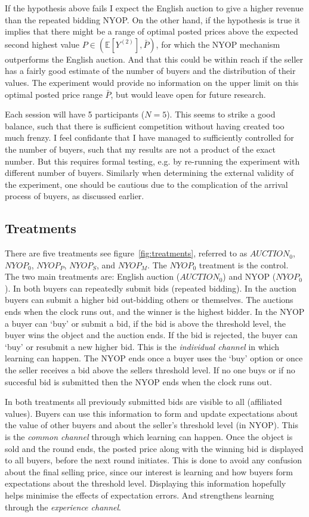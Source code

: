 \documentclass[a4paper,12pt]{article}
\begin{document}
	If the hypothesis above fails I expect the English auction to give a higher revenue than the repeated bidding NYOP. On the other hand, if the hypothesis is true it implies that there might be a range of optimal posted prices above the expected second highest value $P \in (\mathbb{E}[Y^{(2)}], \bar{P})$, for which the NYOP mechanism outperforms the English auction. And that this could be within reach if the seller has a fairly good estimate of the number of buyers and the distribution of their values. The experiment would provide no information on the upper limit on this optimal posted price range $\bar{P}$, but would leave open for future research.
	
	Each session will have 5 participants ($N=5$). This seems to strike a good balance, such that there is sufficient competition without having created too much frenzy. I feel confidante that I have managed to sufficiently controlled for the number of buyers, such that my results are not a product of the exact number. But this requires formal testing, e.g. by re-running the experiment with different number of buyers. Similarly when determining the external validity of the experiment, one should be cautious due to the complication of the arrival process of buyers, as discussed earlier.

	\subsection{Treatments}
	\label{sec:treatments}

	There are five treatments see figure~\ref{fig:treatments}, referred to as $AUCTION_0$, $NYOP_0$, $NYOP_P$, $NYOP_S$, and $NYOP_M$. The $NYOP_0$ treatment is the control. The two main treatments are: English auction ($AUCTION_0$) and NYOP ($NYOP_0$).
	In both buyers can repeatedly submit bids (repeated bidding). In the auction buyers can submit a higher bid out-bidding others or themselves. The auctions ends when the clock runs out, and the winner is the highest bidder. In the NYOP a buyer can `buy' or submit a bid, if the bid is above the threshold level, the buyer wins the object and the auction ends. If the bid is rejected, the buyer can `buy' or resubmit a new higher bid. This is the \emph{individual channel} in which learning can happen. The NYOP ends once a buyer uses the `buy' option or once the seller receives a bid above the sellers threshold level. If no one buys or if no succesful bid is submitted then the NYOP ends when the clock runs out.

	In both treatments all previously submitted bids are visible to all (affiliated values). Buyers can use this information to form and update expectations about the value of other buyers and about the seller's threshold level (in NYOP). This is the \emph{common channel} through which learning can happen. Once the object is sold and the round ends, the posted price along with the winning bid is displayed to all buyers, before the next round initiates. This is done to avoid any confusion about the final selling price, since our interest is learning and how buyers form expectations about the threshold level. Displaying this information hopefully helps minimise the effects of expectation errors. And strengthens learning through the \emph{experience channel}.
\end{document}

